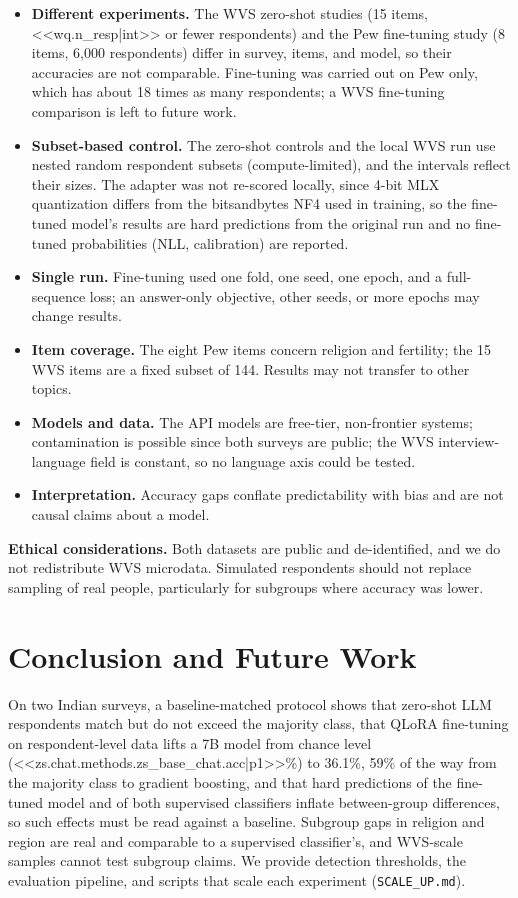 \documentclass[conference]{IEEEtran}
\begin{document}
\begin{itemize}
    \item \textbf{Different experiments.} The WVS zero-shot studies (15 items, <<wq.n_resp|int>> or fewer respondents) and the Pew fine-tuning study (8 items, 6{,}000 respondents) differ in survey, items, and model, so their accuracies are not comparable. Fine-tuning was carried out on Pew only, which has about 18 times as many respondents; a WVS fine-tuning comparison is left to future work.
    \item \textbf{Subset-based control.} The zero-shot controls and the local WVS run use nested random respondent subsets (compute-limited), and the intervals reflect their sizes. The adapter was not re-scored locally, since 4-bit MLX quantization differs from the bitsandbytes NF4 used in training, so the fine-tuned model's results are hard predictions from the original run and no fine-tuned probabilities (NLL, calibration) are reported.
    \item \textbf{Single run.} Fine-tuning used one fold, one seed, one epoch, and a full-sequence loss; an answer-only objective, other seeds, or more epochs may change results.
    \item \textbf{Item coverage.} The eight Pew items concern religion and fertility; the 15 WVS items are a fixed subset of 144. Results may not transfer to other topics.
    \item \textbf{Models and data.} The API models are free-tier, non-frontier systems; contamination is possible since both surveys are public; the WVS interview-language field is constant, so no language axis could be tested.
    \item \textbf{Interpretation.} Accuracy gaps conflate predictability with bias and are not causal claims about a model.
\end{itemize}

\textbf{Ethical considerations.} Both datasets are public and de-identified, and we do not redistribute WVS microdata. Simulated respondents should not replace sampling of real people, particularly for subgroups where accuracy was lower.

\section{Conclusion and Future Work}

On two Indian surveys, a baseline-matched protocol shows that zero-shot LLM respondents match but do not exceed the majority class, that QLoRA fine-tuning on respondent-level data lifts a 7B model from chance level (<<zs.chat.methods.zs_base_chat.acc|p1>>\%) to 36.1\%, 59\% of the way from the majority class to gradient boosting, and that hard predictions of the fine-tuned model and of both supervised classifiers inflate between-group differences, so such effects must be read against a baseline. Subgroup gaps in religion and region are real and comparable to a supervised classifier's, and WVS-scale samples cannot test subgroup claims. We provide detection thresholds, the evaluation pipeline, and scripts that scale each experiment (\texttt{SCALE\_UP.md}).
\end{document}
